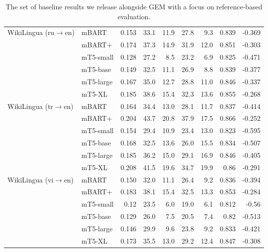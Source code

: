 \documentclass[11pt,a4paper]{article}
\newcommand{\GEM}{\textsc{GEM}}
\begin{document}
\begin{table*}[!htbp]
\begin{tabular}{@{}llrrrrrrr@{}}
\multirow{2}{*}{WikiLingua (ru$\rightarrow$en)} & \small{mBART} & 0.153 & 33.1 & 11.9 & 27.8 & 9.3 & 0.839 & -0.369 \\
 & \small{mBART+} & 0.174 & 37.3 & 14.9 & 31.9 & 12.0 & 0.851 & -0.303 \\
 & \small{mT5-small} & 0.128 & 27.2 & 8.5 & 23.2 & 6.9 & 0.825 & -0.471 \\
& \small{mT5-base} & 0.149 & 32.5 & 11.1 & 26.9 & 8.8 & 0.839 & -0.377 \\
& \small{mT5-large} & 0.167 & 35.0 & 12.7 & 28.8 & 11.0 & 0.846 & -0.337 \\
& \small{mT5-XL} & 0.185 & 38.6 & 15.4 & 32.3 & 13.6 & 0.855 & -0.268 \\
\multirow{2}{*}{WikiLingua (tr$\rightarrow$en)} & \small{mBART} & 0.164 & 34.4 & 13.0 & 28.1 & 11.7 & 0.837 & -0.414 \\
 & \small{mBART+} & 0.204 & 43.7 & 20.8 & 37.9 & 17.5 & 0.866 & -0.252 \\
 & \small{mT5-small} & 0.154 & 29.4 & 10.9 & 23.4 & 13.0 & 0.823 & -0.595 \\
& \small{mT5-base} & 0.168 & 32.5 & 13.6 & 26.0 & 15.5 & 0.834 & -0.507 \\
& \small{mT5-large} & 0.185 & 36.2 & 15.0 & 29.1 & 16.9 & 0.846 & -0.405 \\
& \small{mT5-XL} & 0.208 & 41.5 & 19.6 & 34.7 & 19.9 & 0.86 & -0.291 \\
\multirow{2}{*}{WikiLingua (vi$\rightarrow$en) } & \small{mBART} & 0.150 & 32.0 & 11.1 & 26.4 & 9.2 & 0.836 & -0.394 \\
 & \small{mBART+} & 0.183 & 38.1 & 15.4 & 32.5 & 13.3 & 0.853 & -0.284 \\
 & \small{mT5-small} & 0.12 & 23.5 & 6.0 & 19.0 & 6.1 & 0.812 & -0.56 \\
& \small{mT5-base} & 0.129 & 26.0 & 7.5 & 20.5 & 7.4 & 0.82 & -0.513 \\
& \small{mT5-large} & 0.146 & 29.9 & 9.6 & 23.8 & 9.2 & 0.833 & -0.421 \\
& \small{mT5-XL} & 0.173 & 35.5 & 13.0 & 29.2 & 12.4 & 0.847 & -0.308 \\
\bottomrule
\end{tabular}
\caption{The set of baseline results we release alongside \GEM{} with a focus on reference-based evaluation.}
\label{tab:results}
\end{table*}
\end{document}
